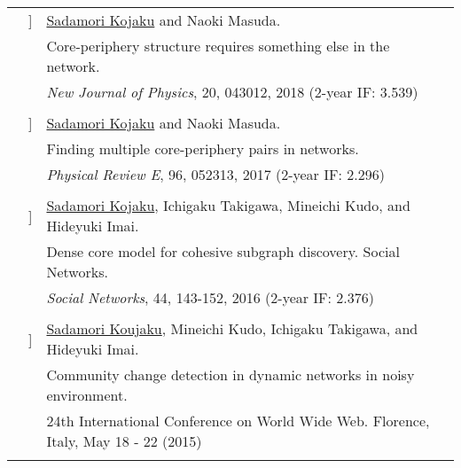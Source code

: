 \documentclass[letterpaper, 11pt]{article}
\newcounter{papercount}
\newcounter{papertype}
\newcommand{\paperitem}{%
\stepcounter{papercount}%
{\color{OliveGreen}{[\Alph{papertype}\thepapercount}]}
}
\begin{document}
\begin{longtable}{p{1.3in}p{2em}p{5.5in}}
                                                    &\paperitem & \underline{Sadamori Kojaku} and Naoki Masuda. \\
                                                    & & Core-periphery structure requires something else in the network. \\
                                                    & & \textit{New Journal of Physics}, 20, 043012, 2018 (2-year IF: 3.539)\\
                                                    &
                                                                                                                                                                                                                                                                              \\
                                                    &\paperitem & \underline{Sadamori Kojaku} and Naoki Masuda. \\
                                                    & & Finding multiple core-periphery pairs in networks. \\
                                                    & & \textit{Physical Review E}, 96, 052313, 2017 (2-year IF: 2.296)\\
                                                    &
                                                                                                                                                                                                                                                                              \\
                                                    &\paperitem & \underline{Sadamori Kojaku}, Ichigaku Takigawa, Mineichi Kudo, and Hideyuki Imai. \\
                                                    & & Dense core model for cohesive subgraph discovery. Social Networks. \\
                                                    & & \textit{Social Networks}, 44, 143-152, 2016 (2-year IF: 2.376)\\
                                                    & \\

                                                    &\paperitem & \underline{Sadamori Koujaku}, Mineichi Kudo, Ichigaku Takigawa, and Hideyuki Imai. \\
                                                    & & Community change detection in dynamic networks in noisy environment. \\
                                                    & & 24th International Conference on World Wide Web. Florence, Italy, May 18 - 22 (2015)\\
                                                    & \\


\end{longtable}
\end{document}
